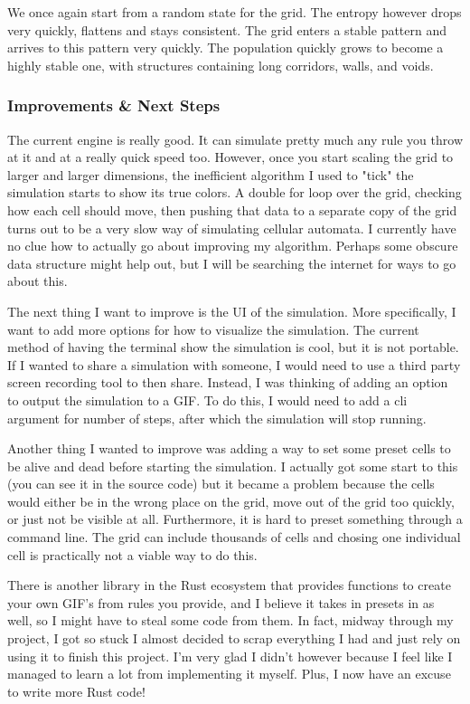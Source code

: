 \documentclass[12pt]{article}
\begin{document}
We once again start from a random state for the grid. The entropy however drops very quickly, flattens and stays consistent. The grid enters a stable pattern and arrives to this pattern very quickly. The population quickly grows to become a highly stable one, with structures containing long corridors, walls, and voids.

\subsubsection{Improvements \& Next Steps}
The current engine is really good. It can simulate pretty much any rule you throw at it and at a really quick speed too. However, once you start scaling the grid to larger and larger dimensions, the inefficient algorithm I used to "tick" the simulation starts to show its true colors. A double for loop over the grid, checking how each cell should move, then pushing that data to a separate copy of the grid turns out to be a very slow way of simulating cellular automata. I currently have no clue how to actually go about improving my algorithm. Perhaps some obscure data structure might help out, but I will be searching the internet for ways to go about this.

The next thing I want to improve is the UI of the simulation. More specifically, I want to add more options for how to visualize the simulation. The current method of having the terminal show the simulation is cool, but it is not portable. If I wanted to share a simulation with someone, I would need to use a third party screen recording tool to then share. Instead, I was thinking of adding an option to output the simulation to a GIF. To do this, I would need to add a cli argument for number of steps, after which the simulation will stop running.

Another thing I wanted to improve was adding a way to set some preset cells to be alive and dead before starting the simulation. I actually got some start to this (you can see it in the source code) but it became a problem because the cells would either be in the wrong place on the grid, move out of the grid too quickly, or just not be visible at all. Furthermore, it is hard to preset something through a command line. The grid can include thousands of cells and chosing one individual cell is practically not a viable way to do this.

There is another library in the Rust ecosystem that provides functions to create your own GIF's from rules you provide, and I believe it takes in presets in as well, so I might have to steal some code from them. In fact, midway through my project, I got so stuck I almost decided to scrap everything I had and just rely on using it to finish this project. I'm very glad I didn't however because I feel like I managed to learn a lot from implementing it myself. Plus, I now have an excuse to write more Rust code!
\end{document}
